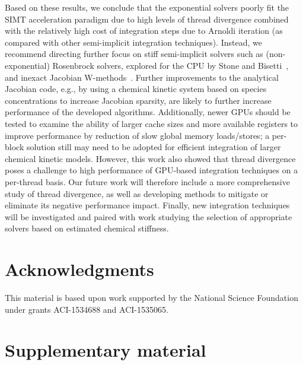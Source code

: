 \documentclass[preprint,review,11pt]{elsarticle}
\begin{document}
Based on these results, we conclude that the exponential solvers poorly fit the SIMT acceleration paradigm due to high levels of thread divergence combined with the relatively high cost of integration steps due to Arnoldi iteration (as compared with other semi-implicit integration techniques).
Instead, we recommend directing further focus on stiff semi-implicit solvers such as (non-exponential) Rosenbrock solvers, explored for the CPU by Stone and Bisetti~\cite{stone2014comparison}, and inexact Jacobian W-methods~\cite{steihaug1979attempt,Schmitt2004}.
Further improvements to the analytical Jacobian code, e.g., by using a chemical kinetic system based on species concentrations to increase Jacobian sparsity, are likely to further increase performance of the developed algorithms.
Additionally, newer GPUs should be tested to examine the ability of larger cache sizes and more available registers to improve performance by reduction of slow global memory loads\slash stores; a per-block solution still may need to be adopted for efficient integration of larger chemical kinetic models.
However, this work also showed that thread divergence poses a challenge to high performance of GPU-based integration techniques on a per-thread basis.
Our future work will therefore include a more comprehensive study of thread divergence, as well as developing methods to mitigate or eliminate its negative performance impact.
Finally, new integration techniques will be investigated and paired with work studying the selection of appropriate solvers based on estimated chemical stiffness.


\section*{Acknowledgments}

This material is based upon work supported by the National Science Foundation under grants ACI-1534688 and ACI-1535065.

\appendix
\setcounter{figure}{0}

\renewcommand*{\thesection}{\appendixname~\Alph{section}}

\section{Supplementary material}
\label{S:supp}
\end{document}
